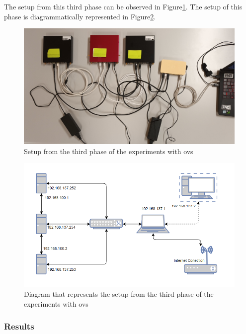 The setup from this third phase can be observed in Figure\ref{fig:exp1_phase3_setup}. The setup of this phase is diagrammatically represented in Figure\ref{fig:exp1_phase3_diagram}.

\begin{figure}
	\centering
	\includegraphics[width=\textwidth]{Chapters/Figures/tests/ovs_phase_3/setup.jpg}
	\caption{Setup from the third phase of the experiments with \gls{ovs}}
	\label{fig:exp1_phase3_setup}
\end{figure}

\begin{figure}
	\centering
	\includegraphics[width=\textwidth]{Chapters/Figures/tests/ovs_phase_3/setup_diagram.PNG}
	\caption{Diagram that represents the setup from the third phase of the experiments with \gls{ovs}}
	\label{fig:exp1_phase3_diagram}
\end{figure}

\subsubsection{Results}

